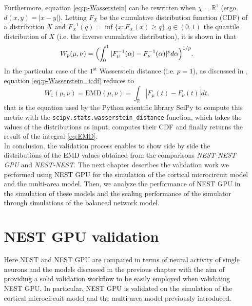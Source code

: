 \documentclass[a4paper, 12pt, twoside, openright]{book}
\begin{document}
Furthermore, equation \eqref{eq:p-Wasserstein} can be rewritten when $\chi = \mathbb{R}^1$ (ergo $d(x,y)=|x-y|$). Letting $F_{X}$ be the cumulative distribution function (CDF) of a distribution $X$ and $F^{-1}_{X}(q) = \inf \{x : F_{X}(x)\geq q\}, q \in (0,1)$ the quantile distribution of $X$ (i.e. the inverse cumulative distribution), it is shown in \cite{Ramdas_Trillos_Cuturi} that
\begin{equation}
    \label{eq:p-Wasserstein_icdf}
    W_p (\mu, \nu) = \Bigl( \int_{0}^{1}|F^{-1}_{\mu}(\alpha) - F^{-1}_{\nu}(\alpha)|^p d\alpha \Bigr)^{1/p}.
\end{equation}
In the particular case of the $1^{\mathrm{st}}$ Wasserstein distance (i.e. $p=1$), as discussed in \cite{Vallender}, equation \eqref{eq:p-Wasserstein_icdf} reduces to
\begin{equation}
    \label{eq:EMD}
    W_1 (\mu, \nu) = \mathrm{EMD}(\mu, \nu) = \int_{\mathbb{R}}|F_{\mu}(t) - F_{\nu}(t)| dt.
\end{equation}
that is the equation used by the Python scientific library SciPy \cite{SciPy} to compute this metric with the \texttt{scipy.stats.wasserstein\_distance} function, which takes the values of the distributions as input, computes their CDF and finally returns the result of the integral \eqref{eq:EMD}.\\
In conclusion, the validation process enables to show side by side the distributions of the EMD values obtained from the comparisons \textit{NEST-NEST GPU} and \textit{NEST-NEST}. The next chapter describes the validation work we performed using NEST GPU for the simulation of the cortical microcircuit model and the multi-area model. Then, we analyze the performance of NEST GPU in the simulation of these models and the scaling performance of the simulator through simulations of the balanced network model.

\chapter{\textbf{NEST GPU validation}}
\label{chapter:comparison_NEST_NGPU}

\begin{tcolorbox}[colback=white,colframe=DarkRed,title=\textbf{Summary}]
Here NEST and NEST GPU are compared in terms of neural activity of single neurons and the models discussed in the previous chapter with the aim of providing a solid validation workflow to be easily employed when validating NEST GPU. In particular, NEST GPU is validated on the simulation of the cortical microcircuit model and the multi-area model previously introduced.
\end{tcolorbox}
\end{document}
